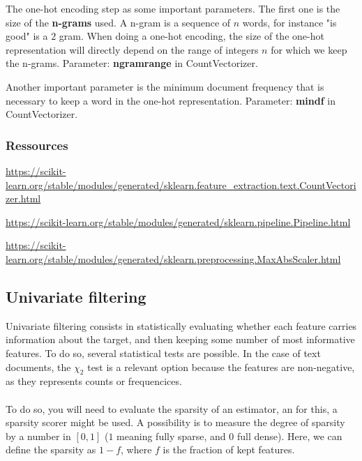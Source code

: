\documentclass[
10pt, %
a4paper, %
oneside, %
headinclude,footinclude, %
BCOR5mm, %
]{scrartcl}
\begin{document}
The one-hot encoding step as some important parameters. The first one is the size of the \textbf{n-grams} used. A n-gram is a sequence of $n$ words, for instance "is good" is a $2$ gram. When doing a one-hot encoding, the size of the one-hot representation will directly depend on the range of integers $n$ for which we keep the n-grams. Parameter: \textbf{ngram\textunderscore range} in CountVectorizer.

Another important parameter is the minimum document frequency that is necessary to keep a word in the one-hot representation. Parameter: \textbf{min\textunderscore df} in CountVectorizer.


\subsubsection{Ressources}
\label{sec:ressources_1}

\url{https://scikit-learn.org/stable/modules/generated/sklearn.feature_extraction.text.CountVectorizer.html} 

\url{https://scikit-learn.org/stable/modules/generated/sklearn.pipeline.Pipeline.html} 

\url{https://scikit-learn.org/stable/modules/generated/sklearn.preprocessing.MaxAbsScaler.html} 


\subsection{Univariate filtering}

Univariate filtering consists in statistically evaluating whether each feature carries information about the target, and then keeping some number of most informative features. To do so, several statistical tests are possible. In the case of text documents, the $\chi_2$ test is a relevant option because the features are non-negative, as they represents counts or frequencices.
\\

{\color{Purple}{Implement an univariate filtering in order to remove some
features from the data and monitor the change in test accuracy after doing a
logistic regression, as in the previous exercise. Observe the compromise
between sparsity and quality of prediction, as a function of the number of kept
features, and save the filtered vocabularies to different files. }}
\\

To do so, you will need to evaluate the sparsity of an estimator, an for this,
a sparsity scorer might be used. A possibility is to measure the degree of
sparsity by a number in $[0, 1]$ ($1$ meaning fully sparse, and $0$ full 
dense). Here, we can define the sparsity as $1-f$, where $f$ is the fraction of
    kept features.
\\
\end{document}
